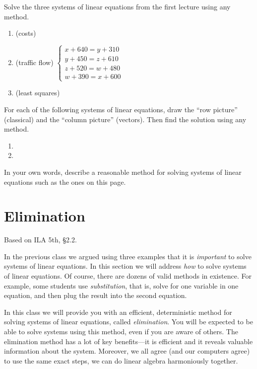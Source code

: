 \documentclass[11pt,oneside]{amsbook}
\theoremstyle{definition}
\theoremstyle{plain}
\theoremstyle{definition}
\theoremstyle{remark}
\numberwithin{equation}{section}
\numberwithin{figure}{section}
\newcounter{activityitem}
\newenvironment{activity}{\begin{list}{\arabic{activityitem}.}{\usecounter{activityitem}\setlength{\itemsep}{.2in}}}{\end{list}}
\begin{document}
\begin{activity}
  \item Solve the three systems of linear equations from the first lecture using any method.
  \begin{enumerate}
    \item (costs) 
    \item (traffic flow) $\begin{cases}x+640=y+310\\y+450=z+610\\z+520=w+480\\w+390=x+600\end{cases}$
    \item (least squares) 
  \end{enumerate}
  \item For each of the following systems of linear equations, draw the ``row picture'' (classical) and the ``column picture'' (vectors). Then find the solution using any method.
  \begin{enumerate}\itemsep 5pt
    \item {}
    \item {}
  \end{enumerate}
  \item In your own words, describe a reasonable method for solving systems of linear equations such as the ones on this page.
\end{activity}


\newpage
\section{Elimination}

Based on ILA 5th, \S 2.2.

In the previous class we argued using three examples that it is \emph{important} to solve systems of linear equations. In this section we will address \emph{how} to solve systems of linear equations. Of course, there are dozens of valid methods in existence. For example, some students use \emph{substitution}, that is, solve for one variable in one equation, and then plug the result into the second equation.

In this class we will provide you with an efficient, deterministic method for solving systems of linear equations, called \emph{elimination}. You will be expected to be able to solve systems using this method, even if you are aware of others. The elimination method has a lot of key benefits---it is efficient and it reveals valuable information about the system. Moreover, we all agree (and our computers agree) to use the same exact steps, we can do linear algebra harmoniously together.
\end{document}
